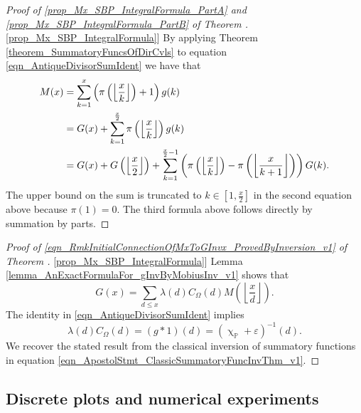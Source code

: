 \documentclass[11pt,reqno,a4letter]{article}
\newcommand{\hlocalref}[1]{\hyperref[#1]{\ref{#1}}}
\numberwithin{equation}{section}
\numberwithin{figure}{section}
\numberwithin{table}{section}
\renewcommand{\chi}{\upchi}
\newcommand{\Floor}[2]{\ensuremath{\left\lfloor \frac{#1}{#2} \right\rfloor}}
\theoremstyle{plain}
\numberwithin{theorem}{section}
\theoremstyle{definition}
\theoremstyle{remark}
\begin{document}
\begin{proof}[Proof of 
              \eqref{prop_Mx_SBP_IntegralFormula_PartA} and \eqref{prop_Mx_SBP_IntegralFormula_PartB} of 
              Theorem \hlocalref{prop_Mx_SBP_IntegralFormula}] 
By applying Theorem \hlocalref{theorem_SummatoryFuncsOfDirCvls} to 
equation \eqref{eqn_AntiqueDivisorSumIdent} we have that 
\begin{align} 
\notag
M(x) & = \sum_{k=1}^{x} \left(\pi\left(\Floor{x}{k}\right)+1\right) g(k) \\ 
\notag 
     & = G(x) + \sum_{k=1}^{\frac{x}{2}} \pi\left(\Floor{x}{k}\right) g(k) \\ 
\notag 
     & = G(x) + G\left(\Floor{x}{2}\right) + 
     \sum_{k=1}^{\frac{x}{2}-1} \left( 
     \pi\left(\Floor{x}{k}\right) - \pi\left(\Floor{x}{k+1}\right) 
	\right) G(k).
\end{align} 
The upper bound on the sum is truncated to $k \in \left[1, \frac{x}{2}\right]$ in the second equation 
above because $\pi(1) = 0$. 
The third formula above follows directly by summation by parts. 
\end{proof} 
\begin{proof}[Proof of \eqref{eqn_RmkInitialConnectionOfMxToGInvx_ProvedByInversion_v1} of 
	      Theorem \hlocalref{prop_Mx_SBP_IntegralFormula}]
Lemma \hlocalref{lemma_AnExactFormulaFor_gInvByMobiusInv_v1} shows that 
\[
G(x) = \sum_{d \leq x} \lambda(d) C_{\Omega}(d) M\left(\Floor{x}{d}\right). 
\]
The identity in \eqref{eqn_AntiqueDivisorSumIdent} implies 
$$\lambda(d) C_{\Omega}(d) = (g \ast 1)(d) = (\chi_{\mathbb{P}} + \varepsilon)^{-1}(d).$$ 
We recover the stated result from the classical inversion of summatory functions in 
equation \eqref{eqn_ApostolStmt_ClassicSummatoryFuncInvThm_v1}. 
\end{proof}

\subsection{Discrete plots and numerical experiments}
\end{document}
